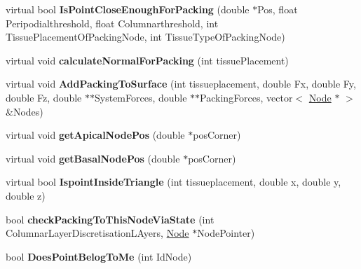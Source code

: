 \begin{DoxyCompactItemize}
\item 
\hypertarget{classShapeBase_a1c09acb3989e4d461c2ce74715214954}{}virtual bool {\bfseries Is\+Point\+Close\+Enough\+For\+Packing} (double $\ast$Pos, float Peripodialthreshold, float Columnarthreshold, int Tissue\+Placement\+Of\+Packing\+Node, int Tissue\+Type\+Of\+Packing\+Node)\label{classShapeBase_a1c09acb3989e4d461c2ce74715214954}

\item 
\hypertarget{classShapeBase_ab6611ef2738450d5990e93ccedcb18ad}{}virtual void {\bfseries calculate\+Normal\+For\+Packing} (int tissue\+Placement)\label{classShapeBase_ab6611ef2738450d5990e93ccedcb18ad}

\item 
\hypertarget{classShapeBase_af715a49333b9ffd4fcd96a3c649cbe2b}{}virtual void {\bfseries Add\+Packing\+To\+Surface} (int tissueplacement, double Fx, double Fy, double Fz, double $\ast$$\ast$System\+Forces, double $\ast$$\ast$Packing\+Forces, vector$<$ \hyperlink{classNode}{Node} $\ast$ $>$ \&Nodes)\label{classShapeBase_af715a49333b9ffd4fcd96a3c649cbe2b}

\item 
\hypertarget{classShapeBase_a8e70b4b3be96de765028face345ad73d}{}virtual void {\bfseries get\+Apical\+Node\+Pos} (double $\ast$pos\+Corner)\label{classShapeBase_a8e70b4b3be96de765028face345ad73d}

\item 
\hypertarget{classShapeBase_a5a6237d792984062e576ecdb87e9c75e}{}virtual void {\bfseries get\+Basal\+Node\+Pos} (double $\ast$pos\+Corner)\label{classShapeBase_a5a6237d792984062e576ecdb87e9c75e}

\item 
\hypertarget{classShapeBase_a0afba3fd829971174cd736b45722758c}{}virtual bool {\bfseries Ispoint\+Inside\+Triangle} (int tissueplacement, double x, double y, double z)\label{classShapeBase_a0afba3fd829971174cd736b45722758c}

\item 
\hypertarget{classShapeBase_a4d7bfb4ed03b7633e02e753a485fbf01}{}bool {\bfseries check\+Packing\+To\+This\+Node\+Via\+State} (int Columnar\+Layer\+Discretisation\+L\+Ayers, \hyperlink{classNode}{Node} $\ast$Node\+Pointer)\label{classShapeBase_a4d7bfb4ed03b7633e02e753a485fbf01}

\item 
\hypertarget{classShapeBase_aed4c893952a6afad718a2037e0635296}{}bool {\bfseries Does\+Point\+Belog\+To\+Me} (int Id\+Node)\label{classShapeBase_aed4c893952a6afad718a2037e0635296}


\end{DoxyCompactItemize}
